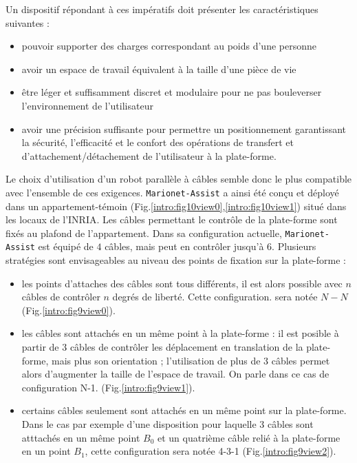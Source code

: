 Un dispositif répondant à ces impératifs doit présenter les caractéristiques 
suivantes :
\begin{itemize}
 \item pouvoir supporter des charges correspondant au poids d'une personne
 \item avoir un espace de travail équivalent à la taille d'une pièce de vie
 \item être léger et suffisamment discret et modulaire pour ne pas bouleverser 
l'environnement de l'utilisateur
 \item avoir une précision suffisante pour permettre un positionnement 
garantissant la sécurité, l'efficacité et le confort des opérations de 
transfert 
et d'attachement/détachement de l'utilisateur à la plate-forme.
\end{itemize}

Le choix d'utilisation d'un robot parallèle à câbles semble donc le plus 
compatible avec l'ensemble de ces exigences. {\tt Marionet-Assist} a ainsi été 
conçu et déployé dans un appartement-témoin 
(Fig.\ref{intro:fig10view0},\ref{intro:fig10view1}) situé dans les locaux 
de l'INRIA. Les câbles permettant le contrôle de la plate-forme sont fixés au 
plafond de l'appartement. Dans sa configuration actuelle, {\tt Marionet-Assist} 
est équipé de $4$ câbles, mais peut en contrôler jusqu'à $6$. Plusieurs 
stratégies sont envisageables au niveau des points de fixation sur la 
plate-forme :
\begin{itemize}
 \item les points d'attaches des câbles sont tous différents, il est alors 
possible avec $n$ câbles de contrôler $n$ degrés de liberté. Cette 
configuration.
sera notée $N-N$ (Fig.\ref{intro:fig9view0}).
 \item les câbles sont attachés en un même point à la plate-forme : il est 
posible à partir de $3$ câbles de contrôler les déplacement en translation de 
la plate-forme, mais plus son orientation ; l'utilisation de plus de $3$ câbles 
permet alors d'augmenter la taille de l'espace de travail. On parle dans ce cas 
de configuration N-1. 
(Fig.\ref{intro:fig9view1}).
 \item certains câbles seulement sont attachés en un même point sur la 
plate-forme. Dans le cas par exemple d'une disposition pour laquelle $3$ câbles 
sont atttachés en un même point $B_0$ et un quatrième câble relié à la 
plate-forme en un point $B_1$, cette configuration sera notée 4-3-1 
(Fig.\ref{intro:fig9view2}).
\end{itemize}

